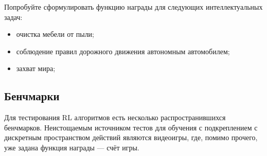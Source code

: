 \begin{example}
Попробуйте сформулировать функцию награды для следующих интеллектуальных задач:
\begin{itemize}
    \item очистка мебели от пыли;
    \item соблюдение правил дорожного движения автономным автомобилем;
    \item захват мира;
\end{itemize}
\end{example}

\subsection{Бенчмарки}

Для тестирования RL алгоритмов есть несколько распространившихся бенчмарков. Неистощаемым источником тестов для обучения с подкреплением с дискретным пространством действий являются видеоигры, где, помимо прочего, уже задана функция награды --- счёт игры.


